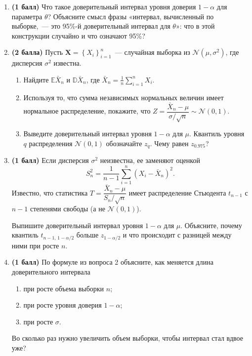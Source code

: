 \documentclass[a4paper,12pt]{article}
\newcommand{\pts}[1]{\textbf{(#1)}}
\begin{document}
\begin{enumerate}
  \item \pts{1 балл} Что такое доверительный интервал уровня доверия $1-\alpha$ для параметра $\theta$? Объясните смысл фразы «интервал, вычисленный по выборке,~--- это 95\%-й доверительный интервал для $\theta$»: что в этой конструкции случайно и что означают 95\%?

  \item \pts{2 балла} Пусть $\mathbf{X}=\left\{X_i\right\}_{i=1}^n$~--- случайная выборка из $\mathcal{N}(\mu,\sigma^2)$, где дисперсия $\sigma^2$ известна.
  \begin{enumerate}[label=(\asbuk*)]
    \item Найдите $\mathbb{E}\bar X_n$ и $\mathbb{D}\bar X_n$, где $\bar X_n=\frac1n\sum_{i=1}^n X_i$.
    \item Используя то, что сумма независимых нормальных величин имеет нормальное распределение, покажите, что $Z=\dfrac{\bar X_n-\mu}{\sigma/\sqrt{n}}\sim\mathcal{N}(0,1)$.
    \item Выведите доверительный интервал уровня $1-\alpha$ для $\mu$. Квантиль уровня $q$ распределения $\mathcal{N}(0,1)$ обозначайте $z_q$. Чему равен $z_{0.975}$?
  \end{enumerate}

  \item \pts{1 балл} Если дисперсия $\sigma^2$ неизвестна, ее заменяют оценкой
  \[
    S_n^2=\frac{1}{n-1}\sum_{i=1}^n\left(X_i-\bar X_n\right)^2.
  \]
  Известно, что статистика $T=\dfrac{\bar X_n-\mu}{S_n/\sqrt{n}}$ имеет распределение Стьюдента $t_{n-1}$ с $n-1$ степенями свободы (а не $\mathcal{N}(0,1)$).

  Выпишите доверительный интервал уровня $1-\alpha$ для $\mu$. Объясните, почему квантиль $t_{n-1,\,1-\alpha/2}$ больше $z_{1-\alpha/2}$ и что происходит с разницей между ними при росте $n$.

  \item \pts{1 балл} По формуле из вопроса 2 объясните, как меняется длина доверительного интервала
  \begin{enumerate}[label=(\asbuk*)]
    \item при росте объема выборки $n$;
    \item при росте уровня доверия $1-\alpha$;
    \item при росте $\sigma$.
  \end{enumerate}
  Во сколько раз нужно увеличить объем выборки, чтобы интервал стал вдвое уже?


\end{enumerate}
\end{document}
